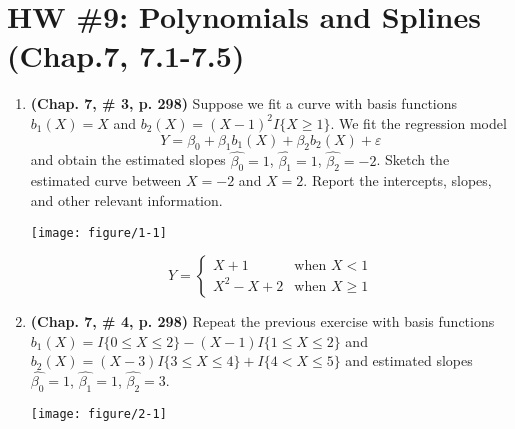\documentclass[12pt,fleqn]{article}\usepackage[]{graphicx}\usepackage[]{color}
\newenvironment{knitrout}{}{} %
\theoremstyle{definition}
\begin{document}
\rhead{\today}




\section*{HW \#9: Polynomials and Splines (Chap.7, 7.1-7.5)}
	\begin{enumerate}[1.]
	  \item \textbf{(Chap. 7, \# 3, p. 298)} Suppose we fit a curve with basis functions $b_1(X) = X$ and $b_2(X) = (X - 1)^2I \{X \geq 1\}$. We fit the regression model
	  $$Y = \beta_0 +\beta_1b_1(X)+ \beta_2b_2(X)+ \varepsilon$$
	  and obtain the estimated slopes $\hat{\beta_0} = 1$, $\hat{\beta_1} = 1$, $\hat{\beta_2} = -2$. Sketch the estimated curve between $X = -2$ and $X = 2$. Report the intercepts, slopes, and other relevant information.\\[-30pt]
\begin{knitrout}
\color{fgcolor}

{\centering \texttt{[image: figure/1-1]} 

}



\end{knitrout}
    \vspace*{-30pt}
    $$Y = \begin{cases}
    X + 1 & \mbox{when } X < 1\\
    X^2 - X + 2 & \mbox{when } X \geq 1
    \end{cases}$$

	  \item \textbf{(Chap. 7, \# 4, p. 298)} Repeat the previous exercise with basis functions $b_1(X) = I\{0 \leq X \leq 2\}-(X-1)I\{1 \leq X \leq 2\}$ and $b_2(X)=(X-3)I\{3 \leq X \leq 4\}+I\{4<X \leq 5\}$ and estimated slopes $\hat{\beta_0} = 1$, $\hat{\beta_1} = 1$, $\hat{\beta_2} = 3$.\\[-30pt]
\begin{knitrout}
\color{fgcolor}

{\centering \texttt{[image: figure/2-1]} 

}




\end{knitrout}
\end{enumerate}
\end{document}
